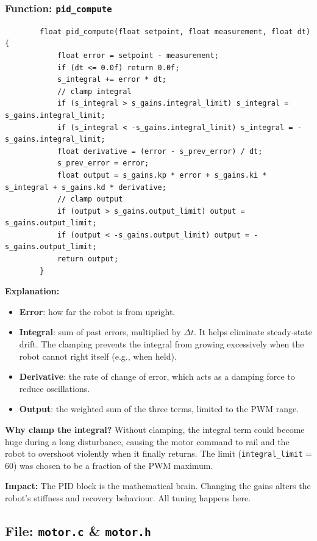 \documentclass[12pt,a4paper]{article}
\newcommand{\file}[1]{\texttt{#1}}
\newcommand{\func}[1]{\texttt{#1}}
\begin{document}
	\subsubsection*{Function: \func{pid\_compute}}
	\begin{lstlisting}
		float pid_compute(float setpoint, float measurement, float dt) {
			float error = setpoint - measurement;
			if (dt <= 0.0f) return 0.0f;
			s_integral += error * dt;
			// clamp integral
			if (s_integral > s_gains.integral_limit) s_integral = s_gains.integral_limit;
			if (s_integral < -s_gains.integral_limit) s_integral = -s_gains.integral_limit;
			float derivative = (error - s_prev_error) / dt;
			s_prev_error = error;
			float output = s_gains.kp * error + s_gains.ki * s_integral + s_gains.kd * derivative;
			// clamp output
			if (output > s_gains.output_limit) output = s_gains.output_limit;
			if (output < -s_gains.output_limit) output = -s_gains.output_limit;
			return output;
		}
	\end{lstlisting}
	\textbf{Explanation:}
	\begin{itemize}
		\item \textbf{Error}: how far the robot is from upright.
		\item \textbf{Integral}: sum of past errors, multiplied by \(\Delta t\). It helps eliminate steady‑state drift. The clamping prevents the integral from growing excessively when the robot cannot right itself (e.g., when held).
		\item \textbf{Derivative}: the rate of change of error, which acts as a damping force to reduce oscillations.
		\item \textbf{Output}: the weighted sum of the three terms, limited to the PWM range.
	\end{itemize}
	\textbf{Why clamp the integral?} Without clamping, the integral term could become huge during a long disturbance, causing the motor command to rail and the robot to overshoot violently when it finally returns. The limit (\texttt{integral\_limit} = 60) was chosen to be a fraction of the PWM maximum.
	
	\textbf{Impact:} The PID block is the mathematical brain. Changing the gains alters the robot’s stiffness and recovery behaviour. All tuning happens here.
	
	\subsection{File: \file{motor.c} \& \file{motor.h}}
	\label{subsec:motor}
\end{document}
